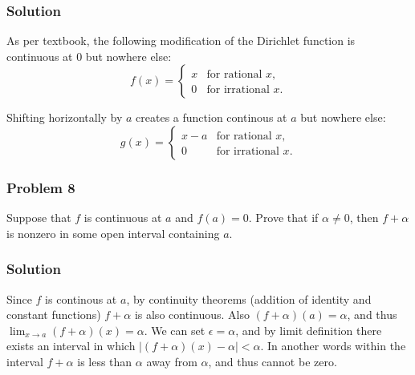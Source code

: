 \subsubsection*{Solution}
As per textbook, the following modification of the Dirichlet function
is continuous at $0$ but nowhere else:
\[
f(x) = 
\begin{cases} 
x & \text{for rational } x,\\
0 & \text{for irrational } x.
\end{cases}
\]

Shifting horizontally by $a$ creates a function continous at $a$ but
nowhere else:
\[
g(x) = 
\begin{cases} 
x-a & \text{for rational } x,\\
0 & \text{for irrational } x.
\end{cases}
\]


\subsubsection*{Problem 8}
Suppose that $f$ is continuous at $a$ and $f(a)=0$. Prove that if $\alpha\neq 0$, then $f+\alpha$ is nonzero in some open interval containing $a$.

\subsubsection*{Solution}
Since $f$ is continous at $a$, by continuity theorems (addition of
identity and constant functions) $f+\alpha$ is also continuous. Also
$(f+\alpha)(a)=\alpha$, and thus $\lim_{x\to a}(f+\alpha)(x)=\alpha$. We can set
$\epsilon=\alpha$, and by limit definition there exists an interval in which
$|(f+\alpha)(x)-\alpha|<\alpha$. In another words within the interval $f+\alpha$ is less
than $\alpha$ away from $\alpha$, and thus cannot be zero.



